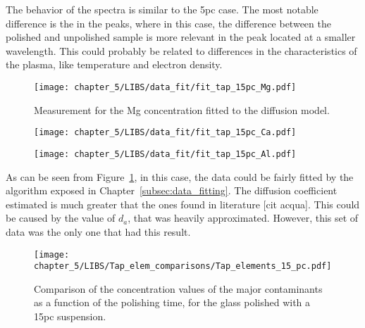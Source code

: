  The behavior of the spectra is similar to the 5pc case. The most notable difference is the in the  peaks, where in this case, the difference between the polished and unpolished sample is more relevant in the peak located at a  smaller wavelength. This could probably be related to differences in the characteristics of the plasma, like temperature and electron density.

\begin{figure}[H]
    \centering
    \texttt{[image: chapter\_5/LIBS/data\_fit/fit\_tap\_15pc\_Mg.pdf]} 
    \vspace{-30pt}
    \caption{Measurement for the Mg concentration fitted to the diffusion model.}
    \label{fig:fit_tap_15pc}
 \end{figure}

 \begin{figure}[H]
    \centering
    \texttt{[image: chapter\_5/LIBS/data\_fit/fit\_tap\_15pc\_Ca.pdf]} 
 \end{figure}
    \vspace{-40pt}
 \begin{figure}[H]
    \centering
    \texttt{[image: chapter\_5/LIBS/data\_fit/fit\_tap\_15pc\_Al.pdf]} 
 \end{figure}

 \vspace{-20pt}

 As can be seen from Figure~\ref{fig:fit_tap_15pc}, in this case, the data could be fairly fitted by the algorithm exposed in Chapter~\ref{subsec:data_fitting}. The diffusion coefficient estimated is much greater that the ones found in literature [cit acqua]. This could be caused by the value of $d_a$, that was heavily approximated. However, this set of data was the only one that had this result.

 \vspace{-20pt}
 \begin{figure}[H]
    \centering
    \texttt{[image: chapter\_5/LIBS/Tap\_elem\_comparisons/Tap\_elements\_15\_pc.pdf]} 
    \vspace*{-30pt}
    \caption{Comparison of the concentration values of the major contaminants as a function of the polishing time, for the glass polished with a 15pc suspension.}
    \label{fig:tap_elem_15pc}
 \end{figure}

